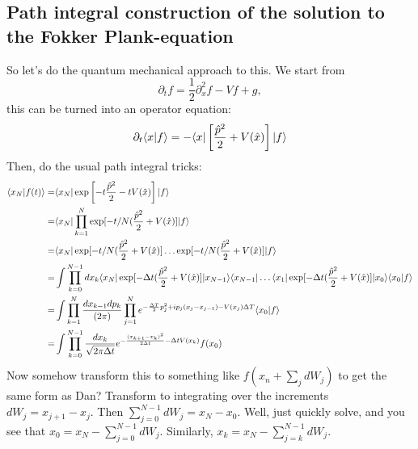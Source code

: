 \subsection{Path integral construction of the solution to the Fokker Plank-equation}

So let's do the quantum mechanical approach to this.  We start from 
\begin{equation}
\partial_t f = \frac{1}{2}\partial_x^2 f - V f + g, 
\end{equation}
this can be turned into an operator equation: 
\begin{equation}
\partial_t\langle x |f\rangle = -\langle x|\left[\frac{\hat{p}^2}{2}+V(\hat{x})\right]|f\rangle
\end{equation}
Then, do the usual path integral tricks:
\begin{align}
\langle x_N|f(t)\rangle =& \langle x_N|\exp\left[-t\frac{\hat{p}^2}{2}-tV(\hat{x})\right]|f\rangle \\
=& \langle x_N|\prod_{k=1}^N\exp[- t/N(\frac{\hat{p}^2}{2}+V(\hat{x})]|f\rangle \\
=& \langle x_N|\exp[- t/N(\frac{\hat{p}^2}{2}+V(\hat{x})] \ldots \exp[- t/N(\frac{\hat{p}^2}{2}+V(\hat{x})]|f\rangle \\
=& \int \prod_{k=0}^{N-1}dx_k \langle x_N|\exp[- \Delta t(\frac{\hat{p}^2}{2}+V(\hat{x})]|x_{N-1}\rangle\langle x_{N-1}| \ldots \langle x_1|\exp[- \Delta t(\frac{\hat{p}^2}{2}+V(\hat{x})]|x_0\rangle\langle x_0|f\rangle \\
=& \int \prod_{k=1}^N\frac{dx_{k-1}dp_k}{(2\pi)}\prod_{j=1}^N e^{-\frac{\Delta T}{2}p_j^2 +ip_j(x_j-x_{j-1}) - V(x_j)\Delta T}\langle x_0|f\rangle \\
=& \int \prod_{k=0}^{N-1}\frac{dx_k}{\sqrt{2\pi \Delta t}}e^{-\frac{(x_{k+1}-x_k)^2}{2\Delta t} - \Delta t V(x_k)}f(x_0)
\end{align}
Now somehow transform this to something like $f(x_n + \sum_{j}dW_j)$ to get the same form as Dan?  Transform to integrating over the increments $dW_j = x_{j+1}-x_j$.  Then $\sum_{j=0}^{N-1} dW_j = x_N - x_0$.  Well, just quickly solve, and you see that $x_0 = x_N - \sum_{j=0}^{N-1}dW_j$.  Similarly, $x_k = x_N - \sum_{j=k}^{N-1}dW_j$.  


